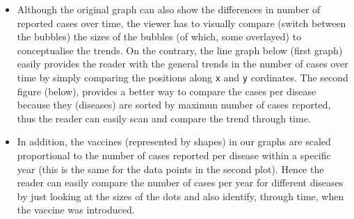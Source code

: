 \documentclass[]{article}
\providecommand{\tightlist}{%
  \setlength{\itemsep}{0pt}\setlength{\parskip}{0pt}}
\begin{document}
\begin{itemize}
\tightlist
\item
  Although the original graph can also show the differences in number of
  reported cases over time, the viewer has to visually compare (switch
  between the bubbles) the sizes of the bubbles (of which, some
  overlayed) to conceptualise the trends. On the contrary, the line
  graph below (first graph) easily provides the reader with the general
  trends in the number of cases over time by simply comparing the
  positions along \texttt{x} and \texttt{y} cordinates. The second
  figure (below), provides a better way to compare the cases per disease
  because they (diseases) are sorted by maximun number of cases
  reported, thus the reader can easily scan and compare the trend
  through time.
\item
  In addition, the vaccines (represented by shapes) in our graphs are
  scaled proportional to the number of cases reported per disease within
  a specific year (this is the same for the data points in the second
  plot). Hence the reader can easily compare the number of cases per
  year for different diseases by just looking at the sizes of the dots
  and also identify, through time, when the vaccine was introduced.
\end{itemize}
\end{document}
